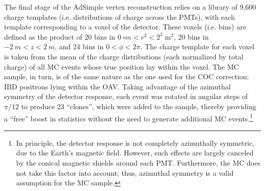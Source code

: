 \documentclass[../thesis.tex]{subfiles}
\begin{document}
The final stage of the AdSimple vertex reconstruction relies on a library of 9,600 charge templates (i.e. distributions of charge across the PMTs), with each template corresponding to a voxel of the detector. These voxels (i.e. bins) are defined as the product of 20 bins in $\SI{0}{\square m} < r^2 < 2^2\;\mathrm{m}^2$, 20 bins in $\SI{-2}{m} < z < \SI{2}{m}$, and 24 bins in $0 < \phi < 2\pi$. The charge template for each voxel is taken from the mean of the charge distributions (each normalized by total charge) of all MC events whose true position lay within the voxel. The MC sample, in turn, is of the same nature as the one used for the COC correction: IBD positrons lying within the OAV. Taking advantage of the azimuthal symmetry of the detector response, each event was rotated in angular steps of $\pi/12$ to produce 23 ``clones'', which were added to the sample, thereby providing a ``free'' boost in statistics without the need to generate additional MC events.\footnote{In principle, the detector response is not completely azimuthally symmetric, due to the Earth's magnetic field. However, such effects are largely canceled by the conical magnetic shields around each PMT. Furthermore, the MC does not take this factor into account; thus, azimuthal symmetry is a valid assumption for the MC sample.}

\newcommand\Niobs{N_i^{\mathrm{obs}}}
\newcommand\Niexp{N_i^{\mathrm{exp}}}
\end{document}
